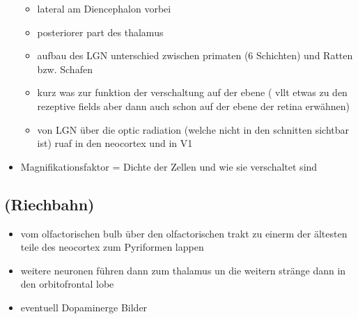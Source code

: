 \documentclass[12pt,a4paper,pdftex]{article}
\begin{document}
\begin{itemize}
    \begin{itemize}
        \item lateral am Diencephalon  vorbei
        \item posteriorer part des thalamus
        \item aufbau des LGN unterschied zwischen primaten (6 Schichten) und Ratten bzw. Schafen
        \item kurz was zur funktion der verschaltung auf der ebene ( vllt etwas zu den rezeptive fields aber dann auch schon auf der ebene der retina erwähnen)
        \item von LGN über die optic radiation (welche nicht in den schnitten sichtbar ist) ruaf in den neocortex und in V1 
    \end{itemize}
    \item Magnifikationsfaktor = Dichte der Zellen und wie sie verschaltet sind
    \\
\end{itemize}
\subsection{(Riechbahn)}
\begin{itemize}
    \item vom olfactorischen bulb über den olfactorischen trakt zu einerm der ältesten teile des neocortex zum Pyriformen lappen
    \item weitere neuronen führen dann zum thalamus un die weitern stränge dann in den orbitofrontal lobe \cite{smith2008biology} 
    \item eventuell Dopaminerge Bilder
\end{itemize}


\newpage



\printindex
\end{document}
